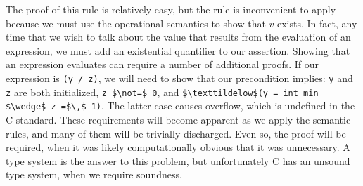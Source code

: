 \documentclass{puthesis}
\begin{document}
The proof of this rule is relatively easy, but the rule is
inconvenient to apply because we must use the operational semantics to
show that $v$ exists. In fact, any time that we wish to talk about the
value that results from the evaluation of an expression, we must add
an existential quantifier to our assertion. Showing that an expression
evaluates can require a number of additional proofs. If our expression
is \lstinline|(y / z)|, we will need to show that our precondition
implies: \lstinline|y| and \lstinline|z| are both initialized,
\lstinline|z $\not=$ 0|, and 
\lstinline|$\texttildelow$(y = int_min $\wedge$ z =$\,$-1)|. 
The latter case causes overflow, which is
undefined in the C standard. These requirements will become apparent
as we apply the semantic rules, and many of them will be trivially
discharged. Even so, the proof will be required, when it was likely
computationally obvious that it was unnecessary. A type system is the
answer to this problem, but unfortunately C has an unsound type
system, when we require soundness.





\end{document}
